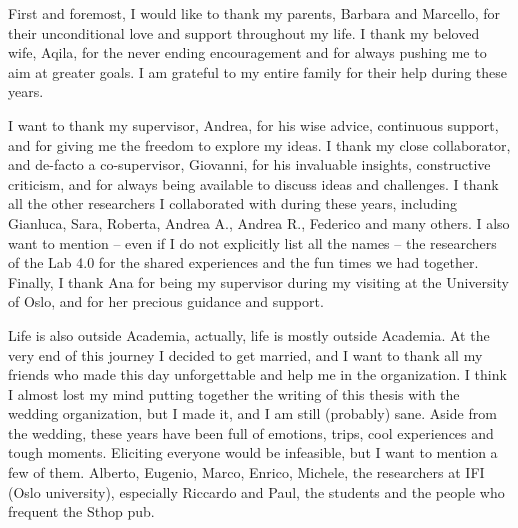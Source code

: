 \documentclass[12pt,a4paper,openright,twoside]{book}
\begin{document}
\begin{acknowledgements} %
    First and foremost, I would like to thank my parents, Barbara and Marcello, for their unconditional love and support throughout my life.
    I thank my beloved wife, Aqila, for the never ending encouragement and for always pushing me to aim at greater goals.
    I am grateful to my entire family for their help during these years.

    I want to thank my supervisor, Andrea, for his wise advice, continuous support, and for giving me the freedom to explore my ideas.
    I thank my close collaborator, and de-facto a co-supervisor, Giovanni, for his invaluable insights, constructive criticism, and for always being available to discuss ideas and challenges.
    I thank all the other researchers I collaborated with during these years, including Gianluca, Sara, Roberta, Andrea A., Andrea R., Federico and many others.
    I also want to mention -- even if I do not explicitly list all the names -- the researchers of the Lab 4.0 for the shared experiences and the fun times we had together.
    Finally, I thank Ana for being my supervisor during my visiting at the University of Oslo, and for her precious guidance and support.

    Life is also outside Academia, actually, life is mostly outside Academia.
    At the very end of this journey I decided to get married, and I want to thank all my friends who made this day unforgettable and help me in the organization.
    I think I almost lost my mind putting together the writing of this thesis with the wedding organization, but I made it, and I am still (probably) sane.
    Aside from the wedding, these years have been full of emotions, trips, cool experiences and tough moments.
    Eliciting everyone would be infeasible, but I want to mention a few of them.
    Alberto, Eugenio, Marco, Enrico, Michele, the researchers at IFI (Oslo university), especially Riccardo and Paul, the students and the people who frequent the Sthop pub.





\end{acknowledgements}

\dominitoc
\tableofcontents   
\listoffigures     %
\listoftables      %
\lstlistoflistings %
\end{document}
